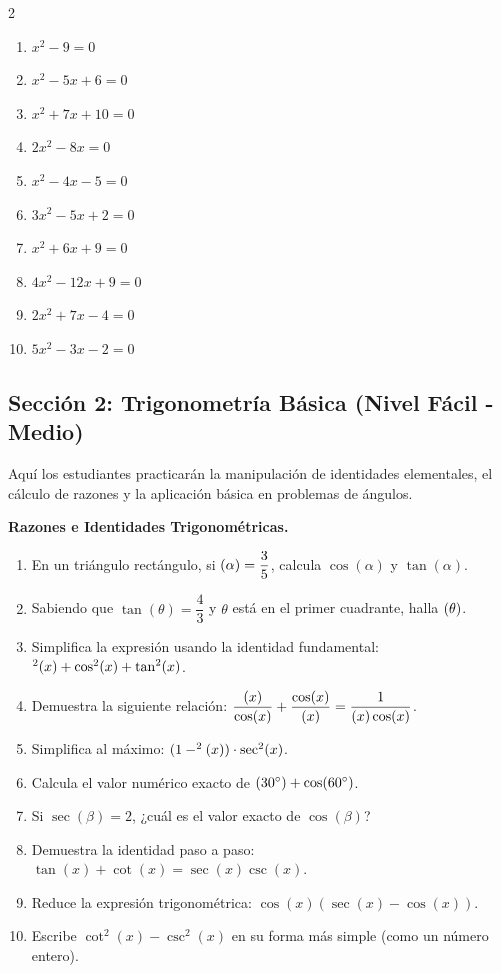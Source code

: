 \documentclass[letterpaper, 12pt]{article}
\let\sin\relax
\DeclareMathOperator{\sin}{sen}
\begin{document}
\begin{multicols}{2}
\begin{enumerate}[label=\textbf{\arabic*.}, leftmargin=*, itemsep=0.3cm, start=11]
    \item $x^2 - 9 = 0$
    \item $x^2 - 5x + 6 = 0$
    \item $x^2 + 7x + 10 = 0$
    \item $2x^2 - 8x = 0$
    \item $x^2 - 4x - 5 = 0$
    \item $3x^2 - 5x + 2 = 0$
    \item $x^2 + 6x + 9 = 0$
    \item $4x^2 - 12x + 9 = 0$
    \item $2x^2 + 7x - 4 = 0$
    \item $5x^2 - 3x - 2 = 0$
\end{enumerate}
\end{multicols}

\newpage

\subsection*{Sección 2: Trigonometría Básica \normalfont\small(Nivel Fácil - Medio)}

Aquí los estudiantes practicarán la manipulación de identidades elementales,
el cálculo de razones y la aplicación básica en problemas de ángulos.

\vspace{0.4cm}

\textbf{Razones e Identidades Trigonométricas.}
\begin{enumerate}[label=\textbf{\arabic*.}, leftmargin=*, itemsep=0.4cm, start=21]
    \item En un triángulo rectángulo, si $\sin(\alpha) = \dfrac{3}{5}$, calcula $\cos(\alpha)$ y $\tan(\alpha)$.
    \item Sabiendo que $\tan(\theta) = \dfrac{4}{3}$ y $\theta$ está en el primer cuadrante, halla $\sin(\theta)$.
    \item Simplifica la expresión usando la identidad fundamental: $\sin^2(x) + \cos^2(x) + \tan^2(x)$.
    \item Demuestra la siguiente relación: $\dfrac{\sin(x)}{\cos(x)} + \dfrac{\cos(x)}{\sin(x)} = \dfrac{1}{\sin(x)\cos(x)}$.
    \item Simplifica al máximo: $(1 - \sin^2(x)) \cdot \sec^2(x)$.
    \item Calcula el valor numérico exacto de $\sin(30^\circ) + \cos(60^\circ)$.
    \item Si $\sec(\beta) = 2$, ¿cuál es el valor exacto de $\cos(\beta)$?
    \item Demuestra la identidad paso a paso: $\tan(x) + \cot(x) = \sec(x)\csc(x)$.
    \item Reduce la expresión trigonométrica: $\cos(x)(\sec(x) - \cos(x))$.
    \item Escribe $\cot^2(x) - \csc^2(x)$ en su forma más simple (como un número entero).
\end{enumerate}
\end{document}
